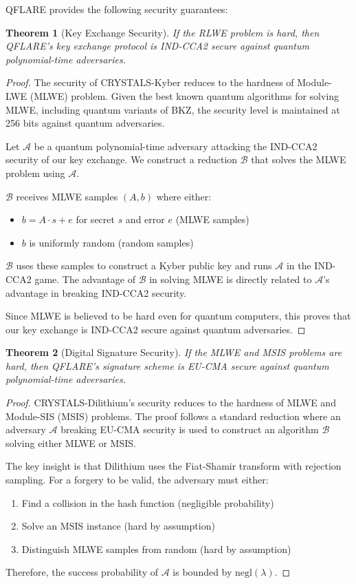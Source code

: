 \documentclass[journal]{IEEEtran}
\newtheorem{theorem}{Theorem}
\newtheorem{proof}{Proof}
\begin{document}
QFLARE provides the following security guarantees:

\begin{theorem}[Key Exchange Security]
If the RLWE problem is hard, then QFLARE's key exchange protocol is IND-CCA2 secure against quantum polynomial-time adversaries.
\end{theorem}

\begin{proof}
The security of CRYSTALS-Kyber reduces to the hardness of Module-LWE (MLWE) problem. Given the best known quantum algorithms for solving MLWE, including quantum variants of BKZ, the security level is maintained at 256 bits against quantum adversaries.

Let $\mathcal{A}$ be a quantum polynomial-time adversary attacking the IND-CCA2 security of our key exchange. We construct a reduction $\mathcal{B}$ that solves the MLWE problem using $\mathcal{A}$.

$\mathcal{B}$ receives MLWE samples $(A, b)$ where either:
\begin{itemize}
\item $b = A \cdot s + e$ for secret $s$ and error $e$ (MLWE samples)
\item $b$ is uniformly random (random samples)
\end{itemize}

$\mathcal{B}$ uses these samples to construct a Kyber public key and runs $\mathcal{A}$ in the IND-CCA2 game. The advantage of $\mathcal{B}$ in solving MLWE is directly related to $\mathcal{A}$'s advantage in breaking IND-CCA2 security.

Since MLWE is believed to be hard even for quantum computers, this proves that our key exchange is IND-CCA2 secure against quantum adversaries.
\end{proof}

\begin{theorem}[Digital Signature Security]
If the MLWE and MSIS problems are hard, then QFLARE's signature scheme is EU-CMA secure against quantum polynomial-time adversaries.
\end{theorem}

\begin{proof}
CRYSTALS-Dilithium's security reduces to the hardness of MLWE and Module-SIS (MSIS) problems. The proof follows a standard reduction where an adversary $\mathcal{A}$ breaking EU-CMA security is used to construct an algorithm $\mathcal{B}$ solving either MLWE or MSIS.

The key insight is that Dilithium uses the Fiat-Shamir transform with rejection sampling. For a forgery to be valid, the adversary must either:
\begin{enumerate}
\item Find a collision in the hash function (negligible probability)
\item Solve an MSIS instance (hard by assumption)
\item Distinguish MLWE samples from random (hard by assumption)
\end{enumerate}

Therefore, the success probability of $\mathcal{A}$ is bounded by $\text{negl}(\lambda)$.
\end{proof}
\end{document}
